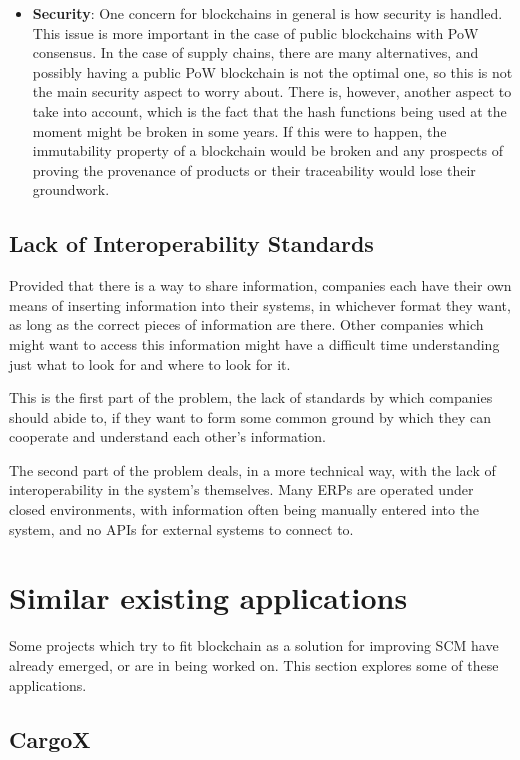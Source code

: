 \begin{itemize}
\item \textbf{Security}: One concern for blockchains in general is how security is handled. This issue is more important in the case of public blockchains with PoW consensus. In the case of supply chains, there are many alternatives, and possibly having a public PoW blockchain is not the optimal one, so this is not the main security aspect to worry about. There is, however, another aspect to take into account, which is the fact that the hash functions being used at the moment might be broken in some years. If this were to happen, the immutability property of a blockchain would be broken and any prospects of proving the provenance of products or their traceability would lose their groundwork.
\end{itemize}

\subsection{Lack of Interoperability Standards}
Provided that there is a way to share information, companies each have their own means of inserting information into their systems, in whichever format they want, as long as the correct pieces of information are there. Other companies which might want to access this information might have a difficult time understanding just what to look for and where to look for it. 

This is the first part of the problem, the lack of standards by which companies should abide to, if they want to form some common ground by which they can cooperate and understand each other's information. 

The second part of the problem deals, in a more technical way, with the lack of interoperability in the system's themselves. Many ERPs are operated under closed environments, with information often being manually entered into the system, and no APIs for external systems to connect to.

\section{Similar existing applications}
Some projects which try to fit blockchain as a solution for improving SCM have already emerged, or are in being worked on. This section explores some of these applications.

\subsection{CargoX}

